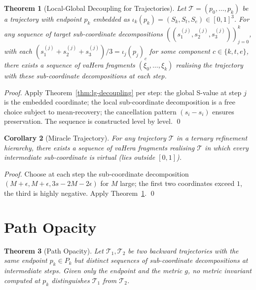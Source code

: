 \documentclass[twocolumn,a4paper]{article}
\newtheorem{theorem}{Theorem}[section]
\newtheorem{corollary}[theorem]{Corollary}
\newcommand{\Sk}{S_{k}}
\newcommand{\St}{S_{t}}
\newcommand{\Se}{S_{e}}
\newcommand{\Trajec}{\mathcal{T}}
\begin{document}
\begin{theorem}[Local-Global Decoupling for Trajectories]
\label{thm:lg-trajectory}
Let $\Trajec=(p_{0},\ldots,p_{k})$ be a trajectory with endpoint $p_{k}$ embedded as $\iota_{k}(p_{k})=(\Sk,\St,\Se)\in[0,1]^{3}$. For any sequence of target sub-coordinate decompositions $((s_{1}^{(j)},s_{2}^{(j)},s_{3}^{(j)}))_{j=0}^{k}$, with each $(s_{1}^{(j)}+s_{2}^{(j)}+s_{3}^{(j)})/3=\iota_{j}(p_{j})_{c}$ for some component $c\in\{k,t,e\}$, there exists a sequence of vaHera fragments $(\xi_{0},\ldots,\xi_{k})$ realising the trajectory with these sub-coordinate decompositions at each step.
\end{theorem}

\begin{proof}
Apply Theorem~\ref{thm:lg-decoupling} per step: the global S-value at step $j$ is the embedded coordinate; the local sub-coordinate decomposition is a free choice subject to mean-recovery; the cancellation pattern $(s_{i}-s_{i})$ ensures preservation. The sequence is constructed level by level. \qed
\end{proof}

\begin{corollary}[Miracle Trajectory]
\label{cor:miracle-trajectory}
For any trajectory $\Trajec$ in a ternary refinement hierarchy, there exists a sequence of vaHera fragments realising $\Trajec$ in which every intermediate sub-coordinate is virtual (lies outside $[0,1]$).
\end{corollary}

\begin{proof}
Choose at each step the sub-coordinate decomposition $(M+\epsilon,M+\epsilon,3s-2M-2\epsilon)$ for $M$ large; the first two coordinates exceed $1$, the third is highly negative. Apply Theorem~\ref{thm:lg-trajectory}. \qed
\end{proof}

\section{Path Opacity}
\label{sec:path-opacity}

\begin{theorem}[Path Opacity]
\label{thm:path-opacity}
Let $\Trajec_{1},\Trajec_{2}$ be two backward trajectories with the same endpoint $p_{k}\in P_{k}$ but distinct sequences of sub-coordinate decompositions at intermediate steps. Given only the endpoint and the metric $g$, no metric invariant computed at $p_{k}$ distinguishes $\Trajec_{1}$ from $\Trajec_{2}$.
\end{theorem}
\end{document}
